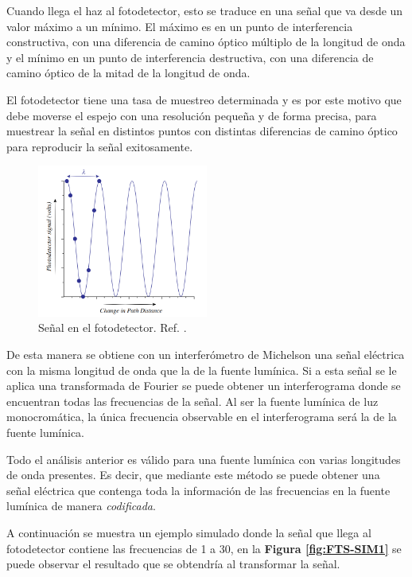\documentclass[11pt,titlepage]{article}
\begin{document}
Cuando llega el haz al fotodetector, esto se traduce en una señal que va desde un valor máximo a un mínimo. El máximo es en un punto de interferencia constructiva, con una diferencia de camino óptico múltiplo de la longitud de onda y el mínimo en un punto de interferencia destructiva, con una diferencia de camino óptico de la mitad de la longitud de onda.\par
El fotodetector tiene una tasa de muestreo determinada y es por este motivo que debe moverse el espejo con una resolución pequeña y de forma precisa, para muestrear la señal en distintos puntos con distintas diferencias de camino óptico para reproducir la señal exitosamente.

    \begin{figure}[ht!]
    \centering
    \includegraphics[width=0.5\textwidth]{fig/Measure FTS.png}
    \caption{Señal en el fotodetector. Ref. \cite{FTS}.}
    \label{fig:MeasureFTS}
\end{figure}

De esta manera se obtiene con un interferómetro de Michelson una señal eléctrica con la misma longitud de onda que la de la fuente lumínica. Si a esta señal se le aplica una transformada de Fourier se puede obtener un interferograma donde se encuentran todas las frecuencias de la señal. Al ser la fuente lumínica de luz monocromática, la única frecuencia observable en el interferograma será la de la fuente lumínica.\par

Todo el análisis anterior es válido para una fuente lumínica con varias longitudes de onda presentes. Es decir, que mediante este método se puede obtener una señal eléctrica que contenga toda la información de las frecuencias en la fuente lumínica de manera \textit{codificada}. \par
A continuación se muestra un ejemplo simulado donde la señal que llega al fotodetector contiene las frecuencias de 1 a 30, en la \textbf{Figura \ref{fig:FTS-SIM1}} se puede observar el resultado que se obtendría al transformar la señal.\par
\end{document}
